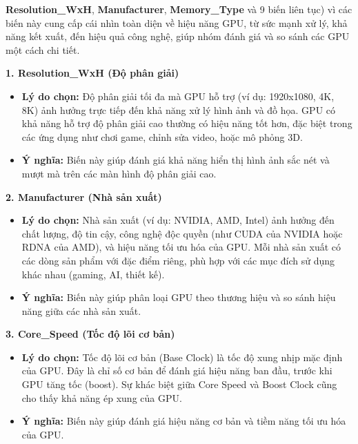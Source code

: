 \colorbox{red!10}{\hspace{2pt}\textbf{Resolution\_WxH}\hspace{2pt}},
\colorbox{red!10}{\hspace{2pt}\textbf{Manufacturer}\hspace{2pt}}, \colorbox{red!10}{\hspace{2pt}\textbf{Memory\_Type}\hspace{2pt}} và 9 biến liên tục) vì các biến này cung cấp cái nhìn toàn diện về hiệu năng GPU, từ sức mạnh xử lý, khả năng kết xuất, đến hiệu quả công nghệ, giúp nhóm đánh giá và so sánh các GPU một cách chi tiết.

\vspace{0.5em}

 \textbf{1. Resolution\_WxH (Độ phân giải)}

 \begin{itemize}
     \item \textbf{\textbf{Lý do chọn:}} Độ phân giải tối đa mà GPU hỗ trợ (ví dụ: 1920x1080, 4K, 8K) ảnh hưởng trực tiếp đến khả năng xử lý hình ảnh và đồ họa. GPU có khả năng hỗ trợ độ phân giải cao thường có hiệu năng tốt hơn, đặc biệt trong các ứng dụng như chơi game, chỉnh sửa video, hoặc mô phỏng 3D.
     \item \textbf{Ý nghĩa:} Biến này giúp đánh giá khả năng hiển thị hình ảnh sắc nét và mượt mà trên các màn hình độ phân giải cao.
 \end{itemize}

 \textbf{2. Manufacturer (Nhà sản xuất)}

 \begin{itemize}
     \item \textbf{\textbf{Lý do chọn:}} Nhà sản xuất (ví dụ: NVIDIA, AMD, Intel) ảnh hưởng đến chất lượng, độ tin cậy, công nghệ độc quyền (như CUDA của NVIDIA hoặc RDNA của AMD), và hiệu năng tối ưu hóa của GPU. Mỗi nhà sản xuất có các dòng sản phẩm với đặc điểm riêng, phù hợp với các mục đích sử dụng khác nhau (gaming, AI, thiết kế).
     \item \textbf{Ý nghĩa:} Biến này giúp phân loại GPU theo thương hiệu và so sánh hiệu năng giữa các nhà sản xuất.
 \end{itemize}

 \textbf{3. Core\_Speed (Tốc độ lõi cơ bản)}

 \begin{itemize}
     \item \textbf{\textbf{Lý do chọn:}} Tốc độ lõi cơ bản (Base Clock) là tốc độ xung nhịp mặc định của GPU. Đây là chỉ số cơ bản để đánh giá hiệu năng ban đầu, trước khi GPU tăng tốc (boost). Sự khác biệt giữa Core Speed và Boost Clock cũng cho thấy khả năng ép xung của GPU.
     \item \textbf{Ý nghĩa:} Biến này giúp đánh giá hiệu năng cơ bản và tiềm năng tối ưu hóa của GPU.
 \end{itemize}

